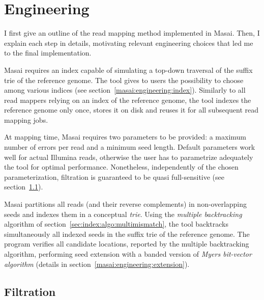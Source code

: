 
\section{Engineering}

I first give an outline of the read mapping method implemented in Masai.
Then, I explain each step in details, motivating relevant engineering choices that led me to the final implementation.

Masai requires an index capable of simulating a top-down traversal of the suffix trie of the reference genome.
The tool gives to users the possibility to choose among various indices (see section~\ref{masai:engineering:index}).
Similarly to all read mappers relying on an index of the reference genome, the tool indexes the reference genome only once, stores it on disk and reuses it for all subsequent read mapping jobs.

At mapping time, Masai requires two parameters to be provided: a maximum number of errors per read and a minimum seed length.
Default parameters work well for actual Illumina reads, otherwise the user has to parametrize adequately the tool for optimal performance.
Nonetheless, independently of the chosen parameterization, filtration is guaranteed to be quasi full-sensitive (see section~\ref{masai:engineering:seeding}).

Masai partitions all reads (and their reverse complements) in non-overlapping seeds and indexes them in a conceptual \emph{trie}.
Using the \emph{multiple backtracking} algorithm of section~\ref{sec:index:algo:multimismatch}, the tool backtracks simultaneously all indexed seeds in the suffix trie of the reference genome.
The program verifies all candidate locations, reported by the multiple backtracking algorithm, performing seed extension with a banded version of \emph{Myers bit-vector algorithm} \citep{Myers1999} (details in section~\ref{masai:engineering:extension}).

\subsection{Filtration}
\label{masai:engineering:seeding}


